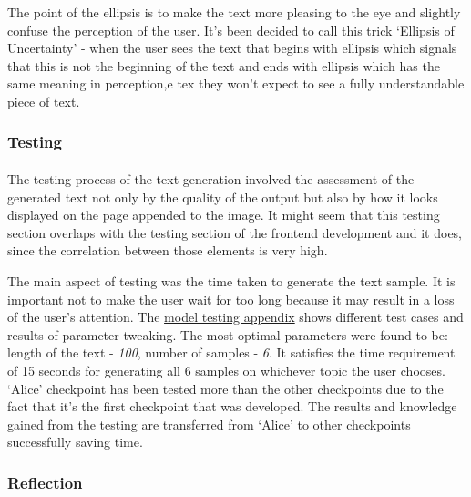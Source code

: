 \documentclass[12pt]{report}
\begin{document}
The point of the ellipsis is to make the text more pleasing to the eye and slightly confuse the perception of the user.
It's been decided to call this trick `Ellipsis of Uncertainty' - when the user sees the text that begins with 
ellipsis which signals that this is not the beginning of the text and ends with ellipsis which has the same meaning
in perception,e tex they won't expect to see a fully understandable piece of text.

\subsubsection*{Testing}
\paragraph{}
The testing process of the text generation involved the assessment of the generated text not only by the quality of
the output but also by how it looks displayed on the page appended to the image. It might seem that this testing
section overlaps with the testing section of the frontend development and it does, since the correlation between 
those elements is very high.

The main aspect of testing was the time taken to generate the text sample. It is important not to make the user
wait for too long because it may result in a loss of the user's attention. The \hyperref[appendix:model_testing]{model testing appendix}
shows different test cases and results of parameter tweaking. The most optimal parameters were found to be: length
of the text - \textit{100}, number of samples - \textit{6}. It satisfies the time requirement of 15 seconds for generating 
all 6 samples on whichever topic the user chooses. `Alice' checkpoint has been tested more than the other checkpoints due
to the fact that it's the first checkpoint that was developed. The results and knowledge gained from the testing are transferred
from `Alice' to other checkpoints successfully saving time.

\subsubsection*{Reflection}
\end{document}
